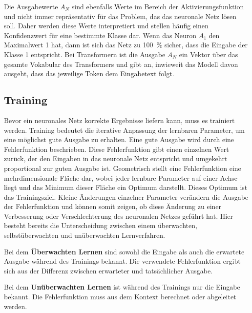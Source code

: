 Die Ausgabewerte $A_N$ sind ebenfalls Werte im Bereich der Aktivierungsfunktion und nicht immer repräsentativ für das Problem, das das neuronale Netz lösen soll.
Daher werden diese Werte interpretiert und stellen häufig einen Konfidenzwert für eine bestimmte Klasse dar.
Wenn das Neuron $A_1$ den Maximalwert 1 hat, dann ist sich das Netz zu \SI{100}{\percent} sicher, dass die Eingabe der Klasse 1 entspricht.
Bei Transformern ist die Ausgabe $A_N$ ein Vektor über das gesamte Vokabular des Transformers und gibt an, inwieweit das Modell davon ausgeht, dass das jeweilige Token dem Eingabetext folgt.\\

\subsection{Training}\label{subsec:grundlagen:training}
Bevor ein neuronales Netz korrekte Ergebnisse liefern kann, muss es trainiert werden.
Training bedeutet die iterative Anpassung der lernbaren Parameter, um eine möglichst gute Ausgabe zu erhalten.
Eine gute Ausgabe wird durch eine Fehlerfunktion beschrieben.
Diese Fehlerfunktion gibt einen einzelnen Wert zurück, der den Eingaben in das neuronale Netz entspricht und umgekehrt proportional zur guten Ausgabe ist.
Geometrisch stellt eine Fehlerfunktion eine mehrdimensionale Fläche dar, wobei jeder lernbare Parameter auf einer Achse liegt und das Minimum dieser Fläche ein Optimum darstellt.
Dieses Optimum ist das Trainingsziel.
Kleine Änderungen einzelner Parameter verändern die Ausgabe der Fehlerfunktion und können somit zeigen, ob diese Änderung zu einer Verbesserung oder Verschlechterung des neuronalen Netzes geführt hat.
Hier besteht bereits die Unterscheidung zwischen einem überwachten, selbstüberwachten und unüberwachten Lernverfahren.\\

\begin{definition}\label{def:ueberwachtes-lernen}
    Bei dem \textbf{Überwachten Lernen} sind sowohl die Eingabe als auch die erwartete Ausgabe während des Trainings bekannt.
    Die verwendete Fehlerfunktion ergibt sich aus der Differenz zwischen erwarteter und tatsächlicher Ausgabe.
\end{definition}

\begin{definition}\label{def:unueberwachtes-lernen}
    Bei dem \textbf{Unüberwachten Lernen} ist während des Trainings nur die Eingabe bekannt.
    Die Fehlerfunktion muss aus dem Kontext berechnet oder abgeleitet werden.
\end{definition}


